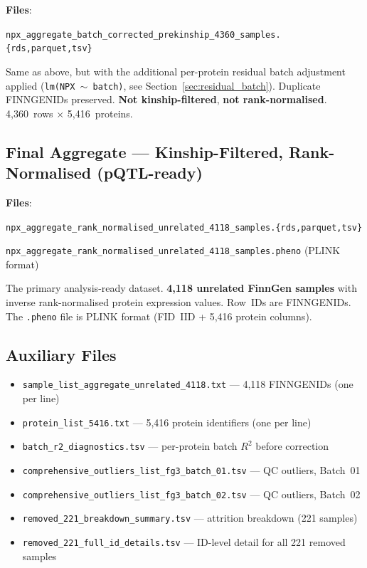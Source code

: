 \documentclass[11pt,a4paper]{article}
\begin{document}
\textbf{Files}:\par\noindent
\texttt{npx\_aggregate\_batch\_corrected\_prekinship\_4360\_samples.\allowbreak\{rds,parquet,tsv\}}

Same as above, but with the additional per-protein residual batch adjustment
applied (\texttt{lm(NPX $\sim$ batch)}, see Section~\ref{sec:residual_batch}).
Duplicate FINNGENIDs preserved. \textbf{Not kinship-filtered}, \textbf{not
rank-normalised}. 4,360~rows $\times$ 5,416~proteins.

\subsection{Final Aggregate --- Kinship-Filtered, Rank-Normalised (pQTL-ready)}

\textbf{Files}:\par\noindent
\texttt{npx\_aggregate\_rank\_normalised\_unrelated\_4118\_samples.\allowbreak\{rds,parquet,tsv\}}\par\noindent
\texttt{npx\_aggregate\_rank\_normalised\_unrelated\_4118\_samples.pheno}
(PLINK format)

The primary analysis-ready dataset. \textbf{4,118 unrelated FinnGen samples}
with inverse rank-normalised protein expression values. Row~IDs are
FINNGENIDs. The \texttt{.pheno} file is PLINK format (FID~IID + 5,416
protein columns).

\subsection{Auxiliary Files}

\begin{itemize}
  \item \texttt{sample\_list\_aggregate\_unrelated\_4118.txt}
        --- 4,118 FINNGENIDs (one per line)
  \item \texttt{protein\_list\_5416.txt}
        --- 5,416 protein identifiers (one per line)
  \item \texttt{batch\_r2\_diagnostics.tsv}
        --- per-protein batch $R^{2}$ before correction
  \item \texttt{comprehensive\_outliers\_list\_fg3\_batch\_01.tsv}
        --- QC outliers, Batch~01
  \item \texttt{comprehensive\_outliers\_list\_fg3\_batch\_02.tsv}
        --- QC outliers, Batch~02
  \item \texttt{removed\_221\_breakdown\_summary.tsv}
        --- attrition breakdown (221 samples)
  \item \texttt{removed\_221\_full\_id\_details.tsv}
        --- ID-level detail for all 221 removed samples
\end{itemize}
\end{document}
